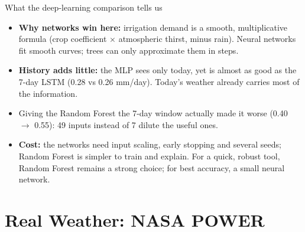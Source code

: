 \documentclass[11pt,aspectratio=169]{beamer}
\begin{document}
\begin{frame}{What the deep-learning comparison tells us}
  \small
  \begin{itemize}
    \item \textbf{Why networks win here:} irrigation demand is a smooth,
      multiplicative formula (crop coefficient $\times$ atmospheric thirst,
      minus rain). Neural networks fit smooth curves; trees can only
      approximate them in steps.
    \item \textbf{History adds little:} the MLP sees only today, yet is almost
      as good as the 7-day LSTM (0.28 vs 0.26 mm/day). Today's weather
      already carries most of the information.
    \item Giving the Random Forest the 7-day window actually made it
      \alert{worse} (0.40 $\rightarrow$ 0.55): 49 inputs instead of 7 dilute
      the useful ones.
    \item \textbf{Cost:} the networks need input scaling, early stopping and
      several seeds; Random Forest is simpler to train and explain. For a
      quick, robust tool, Random Forest remains a strong choice; for best
      accuracy, a small neural network.
  \end{itemize}
\end{frame}

\section{Real Weather: NASA POWER}
\end{document}
